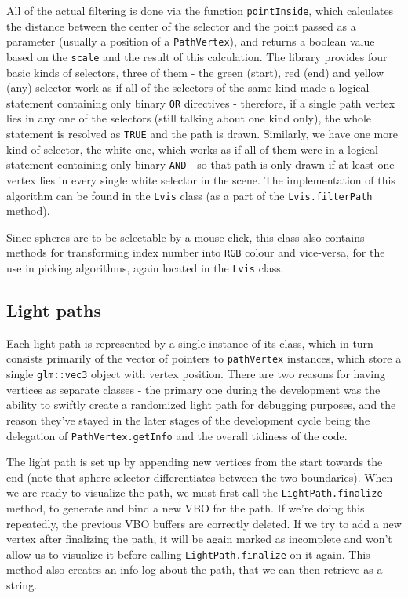 All of the actual filtering is done via the function \texttt{pointInside}, which calculates the distance between the center of the selector and the point passed as a parameter (usually a position of a \texttt{PathVertex}), and returns a boolean value based on the \texttt{scale} and the result of this calculation. The library provides four basic kinds of selectors, three of them - the green (start), red (end) and yellow (any) selector work as if all of the selectors of the same kind made a logical statement containing only binary \texttt{OR} directives - therefore, if a single path vertex lies in any one of the selectors (still talking about one kind only), the whole statement is resolved as \texttt{TRUE} and the path is drawn. Similarly, we have one more kind of selector, the white one, which works as if all of them were in a logical statement containing only binary \texttt{AND} - so that path is only drawn if at least one vertex lies in every single white selector in the scene. The implementation of this algorithm can be found in the \texttt{Lvis} class (as a part of the \texttt{Lvis.filterPath} method).

Since spheres are to be selectable by a mouse click, this class also contains methods for transforming index number into \texttt{RGB} colour and vice-versa, for the use in picking algorithms, again located in the \texttt{Lvis} class.  

\subsection{Light paths}

Each light path is represented by a single instance of its class, which in turn consists primarily of the vector of pointers to \texttt{pathVertex} instances, which store a single \texttt{glm::vec3} object with vertex position. There are two reasons for having vertices as separate classes - the primary one during the development was the ability to swiftly create a randomized light path for debugging purposes, and the reason they've stayed in the later stages of the development cycle being the delegation of \texttt{PathVertex.getInfo} and the overall tidiness of the code. 

The light path is set up by appending new vertices from the start towards the end (note that sphere selector differentiates between the two boundaries). When we are ready to visualize the path, we must first call the \texttt{LightPath.finalize} method, to generate and bind a new VBO for the path. If we're doing this repeatedly, the previous VBO buffers are correctly deleted. If we try to add a new vertex after finalizing the path, it will be again marked as incomplete and won't allow us to visualize it before calling \texttt{LightPath.finalize} on it again. This method also creates an info log about the path, that we can then retrieve as a string.

